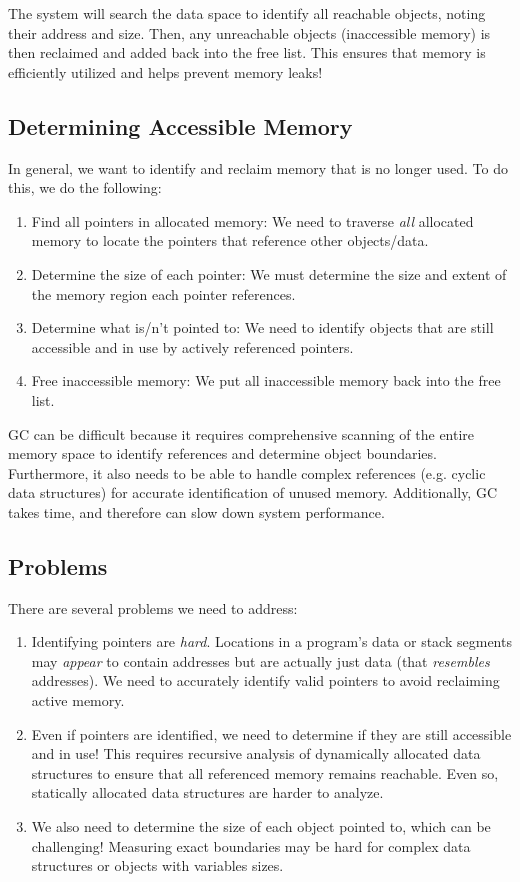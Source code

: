 \documentclass{report}
\begin{document}
The system will search the data space to identify all reachable objects, noting their address and
size. Then, any unreachable objects (inaccessible memory) is then reclaimed and added back into the
free list. This ensures that memory is efficiently utilized and helps prevent memory leaks!


\subsection{Determining Accessible Memory}
In general, we want to identify and reclaim memory that is no longer used. To do this, we do the
following:

\begin{enumerate}[label=\textit{(\roman*)}]
\item Find all pointers in allocated memory: We need to traverse \textit{all} allocated memory to
  locate the pointers that reference other objects/data.
\item Determine the size of each pointer: We must determine the size and extent of the memory
  region each pointer references.
\item Determine what is/n't pointed to: We need to identify objects that are still accessible and in
  use by actively referenced pointers.
\item Free inaccessible memory: We put all inaccessible memory back into the free list.
\end{enumerate}
GC can be difficult because it requires comprehensive scanning of the entire memory space to
identify references and determine object boundaries. Furthermore, it also needs to be able to handle
complex references (e.g. cyclic data structures) for accurate identification of unused
memory. Additionally, GC takes time, and therefore can slow down system performance.


\subsection{Problems}
There are several problems we need to address:
\begin{enumerate}[label=\textit{(\roman*)}]
\item Identifying pointers are \textit{hard}. Locations in a program's data or stack segments may
  \textit{appear} to contain addresses but are actually just data (that \textit{resembles}
  addresses). We need to accurately identify valid pointers to avoid reclaiming active memory.
\item Even if pointers are identified, we need to determine if they are still accessible and in use! This
  requires recursive analysis of dynamically allocated data structures to ensure that all referenced
  memory remains reachable. Even so, statically allocated data structures are harder to analyze.
\item We also need to determine the size of each object pointed to, which can be challenging! Measuring
  exact boundaries may be hard for complex data structures or objects with variables sizes.
\end{enumerate}
\end{document}
